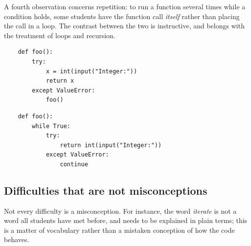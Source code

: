 A fourth observation concerns repetition: to run a function several times while a
condition holds, some students have the function call \emph{itself} rather than
placing the call in a loop. The contrast between the two is instructive, and
belongs with the treatment of loops and recursion.

\hfill
\begin{minipage}[t]{0.45\columnwidth}
  \begin{verbatim}
    def foo():
        try:
            x = int(input("Integer:"))
            return x
        except ValueError:
            foo()
  \end{verbatim}
\end{minipage}
\hfill
\begin{minipage}[t]{0.45\columnwidth}
  \begin{verbatim}
    def foo():
        while True:
            try:
                return int(input("Integer:"))
            except ValueError:
                continue
  \end{verbatim}
\end{minipage}

\subsection{Difficulties that are not misconceptions}

Not every difficulty is a misconception. For instance, the word \emph{iterate}
is not a word all students have met before, and needs to be explained in plain
terms; this is a matter of vocabulary rather than a mistaken conception of how
the code behaves.
